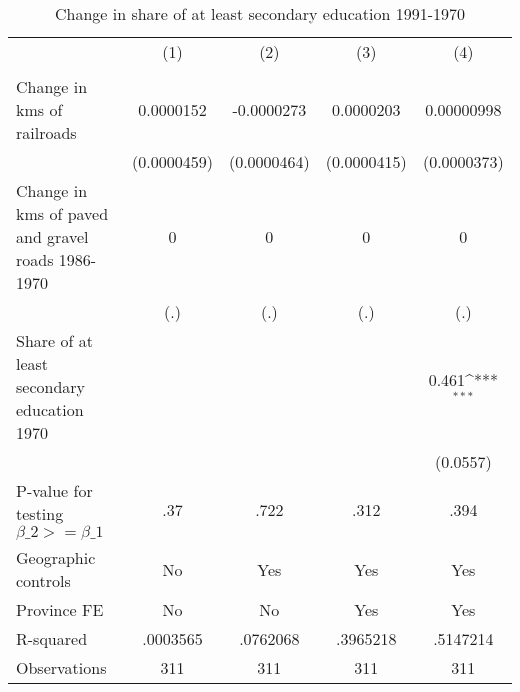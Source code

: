 \begin{table}[htbp]\centering
\def\sym#1{\ifmmode^{#1}\else\(^{#1}\)\fi}
\caption{Change in share of at least secondary education 1991-1970}
\begin{tabular}{l*{4}{c}}
\hline\hline
                &\multicolumn{1}{c}{(1)}&\multicolumn{1}{c}{(2)}&\multicolumn{1}{c}{(3)}&\multicolumn{1}{c}{(4)}\\
                &\multicolumn{1}{c}{}&\multicolumn{1}{c}{}&\multicolumn{1}{c}{}&\multicolumn{1}{c}{}\\
\hline
Change in kms of railroads&0.0000152         &-0.0000273         &0.0000203         &0.00000998         \\
                &(0.0000459)         &(0.0000464)         &(0.0000415)         &(0.0000373)         \\
[1em]
Change in kms of paved and gravel roads 1986-1970&        0         &        0         &        0         &        0         \\
                &      (.)         &      (.)         &      (.)         &      (.)         \\
[1em]
Share of at least secondary education 1970&                  &                  &                  &    0.461\sym{***}\\
                &                  &                  &                  & (0.0557)         \\
\hline
P-value for testing $\beta\_{2} >= \beta\_{1}$&      .37         &     .722         &     .312         &     .394         \\
Geographic controls&       No         &      Yes         &      Yes         &      Yes         \\
Province FE     &       No         &       No         &      Yes         &      Yes         \\
R-squared       & .0003565         & .0762068         & .3965218         & .5147214         \\
Observations    &      311         &      311         &      311         &      311         \\
\hline\hline
\end{tabular}
\end{table}
